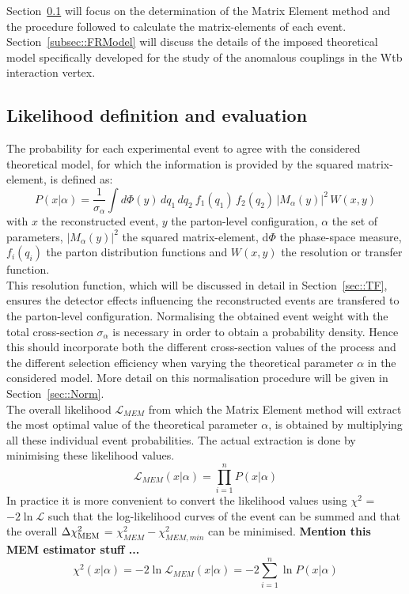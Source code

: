 Section~\ref{subsec::MWLik} will focus on the determination of the Matrix Element method and the procedure followed to calculate the matrix-elements of each event. Section~\ref{subsec::FRModel} will discuss the details of the imposed theoretical model specifically developed for the study of the anomalous couplings in the Wtb interaction vertex.

\subsection{Likelihood definition and evaluation} \label{subsec::MWLik}

The probability for each experimental event to agree with the considered theoretical model, for which the information is provided by the squared matrix-element, 
is defined as:
\begin{equation} \label{eq::MWEvtProb}
 P(x \vert \alpha) = \frac{1}{\sigma_{\alpha}} \int d\Phi(y) \, dq_{1} \, dq_{2} ~ f_{1}(q_{1}) \, f_{2}(q_{2}) \, \vert M_{\alpha}(y) \vert^{2} \, W(x,y)
\end{equation}
with $x$ the reconstructed event, $y$ the parton-level configuration, $\alpha$ the set of parameters, $\vert M_{\alpha}(y) \vert^{2}$ the squared matrix-element, d$\Phi$ the phase-space measure, $f_{i}(q_{i})$ the parton distribution functions and $W(x,y)$ the resolution or transfer function.
\\
This resolution function, which will be discussed in detail in Section~\ref{sec::TF}, ensures the detector effects influencing the reconstructed events are transfered to the parton-level configuration.
Normalising the obtained event weight with the total cross-section $\sigma_{\alpha}$ is necessary in order to obtain a probability density. Hence this should incorporate both the different cross-section values of the process and the different selection efficiency when varying the theoretical parameter $\alpha$ in the considered model. 
More detail on this normalisation procedure will be given in Section~\ref{sec::Norm}.
\\

The overall likelihood $\mathcal{L}_{MEM}$ from which the Matrix Element method will extract the most optimal value of the theoretical parameter $\alpha$, is obtained by multiplying all these individual event probabilities. The actual extraction is done by minimising these likelihood values.
\begin{equation}
 \mathcal{L}_{MEM}(x \vert \alpha) = \prod_{i=1}^{n} P(x \vert \alpha)
\end{equation}
In practice it is more convenient to convert the likelihood values using $\chi^{2}$ = $-2 \ln \mathcal{L}$ such that the log-likelihood curves of the event can be summed and that the overall $\Delta \chi^{2}_{\textrm{MEM}}$ = $\chi^{2}_{MEM} - \chi^{2}_{MEM,min}$ can be minimised. \textbf{Mention this MEM estimator stuff ...}
\begin{equation}
 \chi^{2}(x \vert \alpha) = -2 \ln \mathcal{L}_{MEM}(x \vert \alpha) = -2 \sum_{i=1}^{n} \ln P(x \vert \alpha)
\end{equation}

